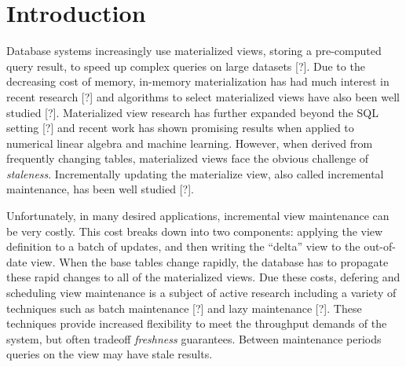 \section{Introduction}
Database systems increasingly use materialized views, storing a pre-computed
query result, to speed up complex queries on large datasets {[}?{]}. 
Due to the decreasing cost of memory, in-memory materialization 
has had much interest in recent research [?] and algorithms
to select materialized views have also been well studied [?].
Materialized view research has further expanded beyond the SQL setting [?] and 
recent work has shown promising results when applied to 
numerical linear algebra and machine learning.
However, when derived from frequently changing tables,
materialized views face the obvious challenge of \emph{staleness}.
Incrementally updating the materialize view,
also called incremental maintenance, has been well studied {[}?{]}.

Unfortunately, in many desired applications, incremental view maintenance
can be very costly. 
This cost breaks down into two components: applying
the view definition to a batch of updates, and then writing the ``delta''
view to the out-of-date view.
When the base tables change rapidly, the database has to propagate these rapid changes to
all of the materialized views.
Due these costs, defering and scheduling view maintenance is a subject of active research including a 
variety of techniques such as batch maintenance {[}?{]} and lazy maintenance {[}?{]}. 
These techniques provide increased flexibility to meet the throughput demands of the system, but 
often tradeoff \emph{freshness} guarantees.
Between maintenance periods queries on the view may have stale results.

